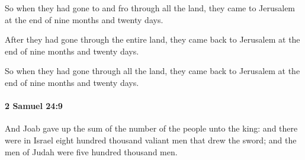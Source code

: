 			\begin{versebox}
					\item[BHS] 
					\item[ASV] So when they had gone to and fro through all the land, they came to Jerusalem at the end of nine months and twenty days.
					\item[NIV] After they had gone through the entire land, they came back to Jerusalem at the end of nine months and twenty days.
					\item[NRSV] So when they had gone through all the land, they came back to Jerusalem at the end of nine months and twenty days.
			\end{versebox}

		\paragraph{2 Samuel 24:9} %
			\label{2SAMUEL-24-9}

			And Joab gave up the sum of the number of the people unto the king: and there were in Israel eight hundred thousand valiant men that drew the sword; and the men of Judah were five hundred thousand men.

